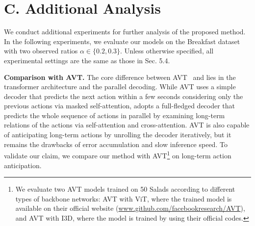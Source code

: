 
\section*{C. Additional Analysis}
\label{sec:C}
We conduct additional experiments for further analysis of the proposed method. In the following experiments, we evaluate our models on the Breakfast dataset with two observed ratios $\alpha \in \{0.2, 0.3\}$. Unless otherwise specified, all experimental settings are the same as those in Sec. 5.4.










\noindent
\textbf{Comparison with AVT.}
The core difference between AVT~\cite{girdhar2021anticipative} and \ours lies in the transformer architecture and the parallel decoding. 
While AVT uses a simple decoder that predicts the next action within a few seconds considering only the previous actions via masked self-attention, \ours adopts a full-fledged decoder that predicts the whole sequence of actions in parallel by examining long-term relations of the actions via self-attention and cross-attention. 
AVT is also capable of anticipating long-term actions by unrolling the decoder iteratively, but it remains the drawbacks of error accumulation and slow inference speed. 
To validate our claim, we compare our method with AVT\footnote{We evaluate two AVT models trained on 50 Salads according to different types of backbone networks: AVT with ViT, where the trained model is available on their official website (\url{www.github.com/facebookresearch/AVT}), and AVT with I3D, where the model is trained by using their official codes.}
on long-term action anticipation.

